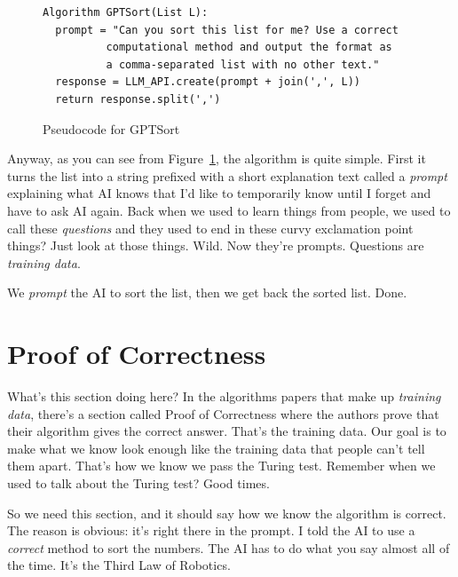 \documentclass[sigconf]{acmart}\settopmatter{printfolios=false,printccs=false,printacmref=false}
\theoremstyle{definition}
\begin{document}
\begin{figure}
\begin{lstlisting}[showspaces=false]
Algorithm GPTSort(List L):
  prompt = "Can you sort this list for me? Use a correct
          computational method and output the format as
          a comma-separated list with no other text."
  response = LLM_API.create(prompt + join(',', L))
  return response.split(',')
\end{lstlisting}
\caption{Pseudocode for GPTSort}
\label{fig:pseudocode}
\end{figure}

Anyway, as you can see from Figure~\ref{fig:pseudocode}, the algorithm is
quite simple.
%
First it turns the list into a string prefixed with a short explanation text
called a {\em prompt} explaining what AI knows that I'd like to temporarily
know until I forget and have to ask AI again.
%
Back when we used to learn things from people, we used to call these
{\em questions} and they used to end in these curvy exclamation point things?
%
Just look at those things.
%
Wild.
%
Now they're prompts.
%
Questions are {\em training data}.

We {\em prompt} the AI to sort the list, then we get back the sorted list.
%
Done.

\section{Proof of Correctness}

What's this section doing here?
%
In the algorithms papers that make up {\em training data}, there's a
section called Proof of Correctness where the authors prove that their
algorithm gives the correct answer.
%
That's the training data.
%
Our goal is to make what we know look enough like the training data that
people can't tell them apart.
%
That's how we know we pass the Turing test.
%
Remember when we used to talk about the Turing test?
%
Good times.

So we need this section, and it should say how we know the algorithm is
correct.
%
The reason is obvious: it's right there in the prompt.
%
I told the AI to use a {\em correct} method to sort the numbers.
%
The AI has to do what you say almost all of the time.
%
It's the Third Law of Robotics\cite{irobot}.
\end{document}
